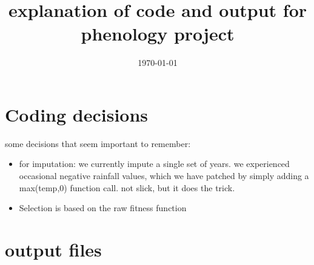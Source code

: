 \documentclass[11pt,a4paper]{article}
\title{explanation of code and output for phenology project}
\author{}
\date{\today}
\begin{document}
\maketitle
\section{Coding decisions}
some decisions that seem important to remember:
\begin{itemize}
	\item for imputation: we currently impute a single set of years. we experienced occasional negative rainfall values, which we have patched by simply adding a max(temp,0) function call. not slick, but it does the trick. 
	\item Selection is based on the raw fitness function
\end{itemize}

\section{output files}
\end{document}
